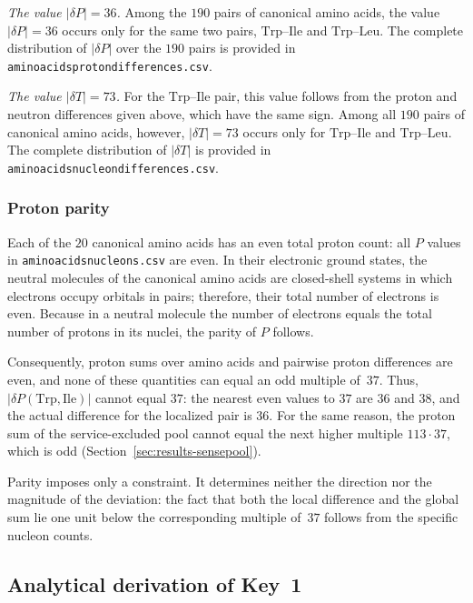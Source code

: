 \documentclass[11pt,a4paper]{article}
\renewcommand{\_}{\origunderscore\allowbreak}
\begin{document}
\emph{The value $|\delta P| = 36$.} Among the $190$ pairs of canonical
amino acids, the value $|\delta P| = 36$ occurs only for the same two
pairs, $\mathrm{Trp}$--$\mathrm{Ile}$ and
$\mathrm{Trp}$--$\mathrm{Leu}$. The complete distribution of
$|\delta P|$ over the $190$ pairs is provided in
\texttt{amino\_acids\_proton\_differences.csv}.

\emph{The value $|\delta T| = 73$.} For the
$\mathrm{Trp}$--$\mathrm{Ile}$ pair, this value follows from the
proton and neutron differences given above, which have the same sign.
Among all $190$ pairs of canonical amino acids, however,
$|\delta T| = 73$ occurs only for
$\mathrm{Trp}$--$\mathrm{Ile}$ and
$\mathrm{Trp}$--$\mathrm{Leu}$. The complete distribution of
$|\delta T|$ is provided in
\texttt{amino\_acids\_nucleon\_differences.csv}.

\subsubsection{Proton parity}
\label{sec:results-proton-parity}

Each of the $20$ canonical amino acids has an even total proton count:
all $P$ values in \texttt{amino\_acids\_nucleons.csv} are even. In
their electronic ground states, the neutral molecules of the canonical
amino acids are closed-shell systems in which electrons occupy
orbitals in pairs; therefore, their total number of electrons is even.
Because in a neutral molecule the number of electrons equals the total
number of protons in its nuclei, the parity of $P$ follows.

Consequently, proton sums over amino acids and pairwise proton
differences are even, and none of these quantities can equal an odd
multiple of~$37$. Thus,
$|\delta P(\mathrm{Trp},\mathrm{Ile})|$ cannot equal $37$: the nearest
even values to $37$ are $36$ and $38$, and the actual difference for
the localized pair is $36$. For the same reason, the proton sum of the
service-excluded pool cannot equal the next higher multiple
$113 \cdot 37$, which is odd
(Section~\ref{sec:results-sensepool}).

Parity imposes only a constraint. It determines neither the direction
nor the magnitude of the deviation: the fact that both the local
difference and the global sum lie one unit below the corresponding
multiple of~$37$ follows from the specific nucleon counts.

\subsection{Analytical derivation of Key~1}
\label{sec:results-key1-derivation}
\end{document}
